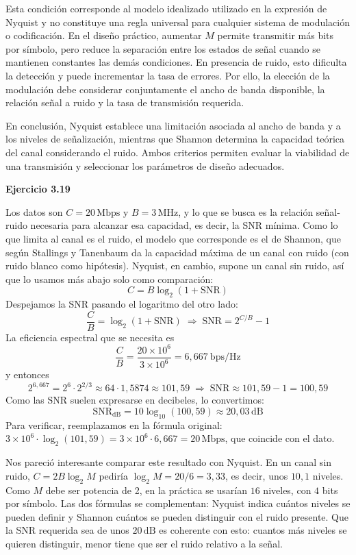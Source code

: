 \documentclass[11pt,a4paper]{article}
\begin{document}
Esta condición corresponde al modelo idealizado utilizado en la expresión de Nyquist y no constituye una regla universal para cualquier sistema de modulación o codificación.
En el diseño práctico, aumentar $M$ permite transmitir más bits por símbolo, pero reduce la separación entre los estados de señal cuando se mantienen constantes las demás condiciones. En presencia de ruido, esto dificulta la detección y puede incrementar la tasa de errores. Por ello, la elección de la modulación debe considerar conjuntamente el ancho de banda disponible, la relación señal a ruido y la tasa de transmisión requerida. \newline

En conclusión, Nyquist establece una limitación asociada al ancho de banda y a los niveles de señalización, mientras que Shannon determina la capacidad teórica del canal considerando el ruido. Ambos criterios permiten evaluar la viabilidad de una transmisión y seleccionar los parámetros de diseño adecuados.


\vspace{0.3cm}
\noindent\textbf{Ejercicio 3.19}\par
Los datos son $C = 20\,\mathrm{Mbps}$ y $B = 3\,\mathrm{MHz}$, y lo que se busca es la relación señal-ruido necesaria para alcanzar esa capacidad, es decir, la SNR mínima. Como lo que limita al canal es el ruido, el modelo que corresponde es el de Shannon, que según Stallings y Tanenbaum da la capacidad máxima de un canal con ruido (con ruido blanco como hipótesis). Nyquist, en cambio, supone un canal sin ruido, así que lo usamos más abajo solo como comparación:
\[
  C = B\log_2(1+\mathrm{SNR})
\]
Despejamos la SNR pasando el logaritmo del otro lado:
\[
  \frac{C}{B}=\log_2(1+\mathrm{SNR})
  \;\Longrightarrow\;
  \mathrm{SNR}=2^{C/B}-1
\]
La eficiencia espectral que se necesita es
\[
  \frac{C}{B}=\frac{20\times10^{6}}{3\times10^{6}}=6{,}667~\mathrm{bps/Hz}
\]
y entonces
\[
  2^{6{,}667}=2^{6}\cdot2^{2/3}\approx64\cdot1{,}5874\approx101{,}59
  \;\Longrightarrow\;
  \mathrm{SNR}\approx101{,}59-1=100{,}59
\]
Como las SNR suelen expresarse en decibeles, lo convertimos:
\[
  \mathrm{SNR}_{\mathrm{dB}}=10\log_{10}(100{,}59)\approx\boxed{20{,}03\,\mathrm{dB}}
\]
Para verificar, reemplazamos en la fórmula original: $3\times10^{6}\cdot\log_2(101{,}59)=3\times10^{6}\cdot6{,}667=20\,\mathrm{Mbps}$, que coincide con el dato.

Nos pareció interesante comparar este resultado con Nyquist. En un canal sin ruido, $C=2B\log_2M$ pediría $\log_2M=20/6=3{,}33$, es decir, unos $10{,}1$ niveles. Como $M$ debe ser potencia de 2, en la práctica se usarían $16$ niveles, con $4$ bits por símbolo. Las dos fórmulas se complementan: Nyquist indica cuántos niveles se pueden definir y Shannon cuántos se pueden distinguir con el ruido presente. Que la SNR requerida sea de unos $20\,\mathrm{dB}$ es coherente con esto: cuantos más niveles se quieren distinguir, menor tiene que ser el ruido relativo a la señal.
\end{document}
